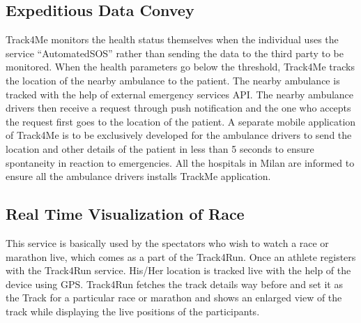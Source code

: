 \subsection{Expeditious Data Convey}
\qquad Track4Me monitors the health status themselves when the individual uses the service “AutomatedSOS” rather than sending the data to the third party to be monitored. When the health parameters go below the threshold, Track4Me tracks the location of the nearby ambulance to the patient. The nearby ambulance is tracked with the help of external emergency services API. The nearby ambulance drivers then receive a request through push notification and the one who accepts the request first goes to the location of the patient. A separate mobile application of Track4Me is to be exclusively developed for the ambulance drivers to send the location and other details of the patient in less than 5 seconds to ensure spontaneity in reaction to emergencies. All the hospitals in Milan are informed to ensure all the ambulance drivers installs TrackMe application.

\subsection{Real Time Visualization of Race}
\qquad This service is basically used by the spectators who wish to watch a race or marathon live, which comes as a part of the Track4Run. Once an athlete registers with the Track4Run service. His/Her location is tracked live with the help of the device using GPS. Track4Run fetches the track details way before and set it as the Track for a particular race or marathon and shows an enlarged view of the track while displaying the live positions of the participants.